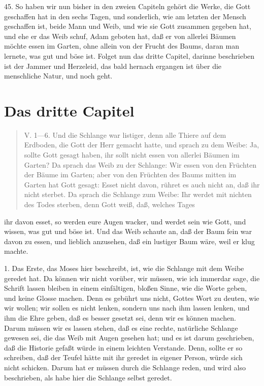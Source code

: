 45. So haben wir nun bisher in den zweien Capiteln gehört die Werke, die Gott geschaffen hat in den sechs Tagen, und sonderlich, wie am letzten der Mensch geschaffen ist, beide Mann und Weib, und wie sie Gott zusammen gegeben hat, und ehe er das Weib schuf, Adam geboten hat, daß er von allerlei Bäumen möchte essen im Garten, ohne allein von der Frucht des Baums, daran man lernete, was gut und böse ist. Folget nun das dritte Capitel, darinne beschrieben ist der Jammer und Herzeleid, das bald hernach ergangen ist über die menschliche Natur, und noch geht.

\section{Das dritte Capitel}

\begin{quote}
V. 1—6. Und die Schlange war listiger, denn alle Thiere auf dem Erdboden, die Gott der Herr gemacht hatte, und sprach zu dem Weibe: Ja, sollte Gott gesagt haben, ihr sollt nicht essen von allerlei Bäumen im Garten? Da sprach das Weib zu der Schlange: Wir essen von den Früchten der Bäume im Garten; aber von den Früchten des Baums mitten im Garten hat Gott gesagt: Esset nicht davon, rühret es auch nicht an, daß ihr nicht sterbet. Da sprach die Schlange zum Weibe: Ihr werdet mit nichten des Todes sterben, denn Gott weiß, daß, welches Tages
\end{quote}
ihr davon esset, so werden eure Augen wacker, und werdet sein wie Gott, und wissen, was gut und böse ist. Und das Weib schaute an, daß der Baum fein war davon zu essen, und lieblich anzusehen, daß ein lustiger Baum wäre, weil er klug machte.

1. Das Erste, das Moses hier beschreibt, ist, wie die Schlange mit dem Weibe geredet hat. Da können wir nicht vorüber, wir müssen, wie ich immerdar sage, die Schrift lassen bleiben in einem einfältigen, bloßen Sinne, wie die Worte geben, und keine Glosse machen. Denn es gebührt uns nicht, Gottes Wort zu deuten, wie wir wollen; wir sollen es nicht lenken, sondern uns nach ihm lassen lenken, und ihm die Ehre geben, daß es besser gesetzt sei, denn wir es können machen. Darum müssen wir es lassen stehen, daß es eine rechte, natürliche Schlange gewesen sei, die das Weib mit Augen gesehen hat; und es ist darum geschrieben, daß die Historie gefaßt würde in einem leichten Verstande. Denn, sollte er so schreiben, daß der Teufel hätte mit ihr geredet in eigener Person, würde sich nicht schicken. Darum hat er müssen durch die Schlange reden, und wird also beschrieben, als habe hier die Schlange selbst geredet.

